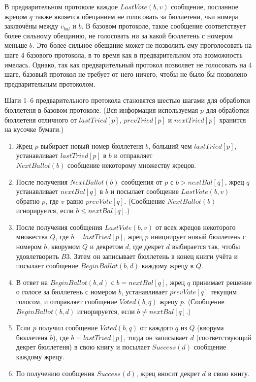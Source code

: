 \documentclass[12pt, a4paper]{article} %
\begin{document}
В предварительном протоколе каждое $LastVote(b, v)$ сообщение, посланное жрецом $q$ также является обещанием не голосовать за бюллетени, чьи номера заключёны между $v_{bal}$ и $b$. В базовом протоколе, такое сообщение соответствует более сильному обещанию, не голосовать ни за какой бюллетень с номером меньше $b$. Это более сильное обещание может не позволить ему проголосовать на шаге 4 базового протокола, в то время как в предварительном эта возможность имелась. Однако, так как предварительный протокол позволяет не голосовать на 4 шаге, базовый протокол не требует от него ничего, чтобы не было бы позволено предварительным протоколом.

Шаги 1--6 предварительного протокола становятся шестью шагами для обработки бюллетеня в базовом протоколе. (Вся информация используемая $p$ для обработки бюллетеня отличного от $lastTried[p]$, $prevTried[p]$ и $nextTried[p]$ хранится на кусочке бумаги.)

\begin{enumerate}
    \item Жрец $p$ выбирает новый номер бюллетеня $b$, больший чем $lastTried[p]$, устанавливает $lastTried[p]$ в $b$ и отправляет \\
    $NextBallot(b)$ сообщение некоторому множеству жрецов.
   
   \item После получения $NextBallot(b)$ сообщения от $p$ с $b > nextBal[q]$, жрец $q$ устанавливает $nextBal[q]$ в $b$ и посылает сообщение $LastVote(b, v)$ обратно $p$, где $v$ равно $prevVote[q]$. (Сообщение $NextBallot(b)$ игнорируется, если $b \leqslant nextBal[q]$.)
   
   \item После получения сообщения $LastVote(b, v)$ от всех жрецов некоторого множества $Q$, где $b = lastTried[p]$, жрец $p$ инициирует новый бюллетень с номером $b$, кворумом $Q$ и декретом $d$, где декрет $d$ выбирается так, чтобы удовлетворить $B3$. Затем он записывает бюллетень в конец книги учёта и посылает сообщение $BeginBallot(b, d)$ каждому жрецу в $Q$.
   
   \item В ответ на $BeginBallot(b, d)$ с $b = nextBal[q]$, жрец $q$ принимает решение о голосе за бюллетень с номером $b$, устанавливает $prevVote[q]$ текущим голосом, и  отправляет сообщение $Voted(b, q)$ жрецу $p$. (Сообщение $BeginBallot(b, d)$ игнорируется, если $b \neq nextBal[q]$.)
    
    \item Если $p$ получил сообщение $Voted(b, q)$ от каждого $q$ из $Q$ (кворума бюллетеня $b$), где $b = lastTried[p]$, тогда он записывает $d$ (соответствующий декрет бюллетеня) в свою книгу и посылает $Success(d)$ сообщение каждому жрецу.

    \item По получению сообщения $Success(d)$, жрец вносит декрет $d$ в свою книгу.
\end{enumerate}
\end{document}
